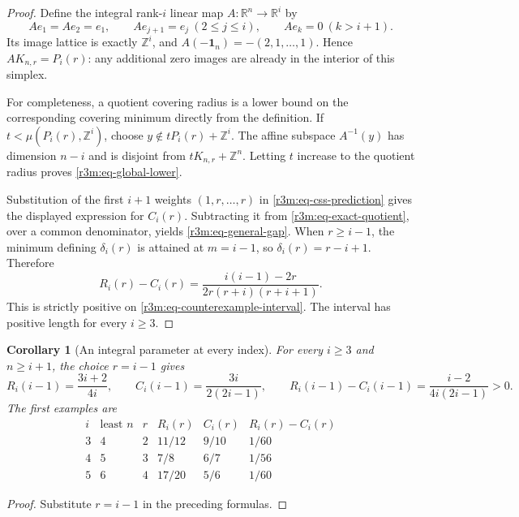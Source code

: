 \documentclass[11pt,a4paper]{article}
\newtheorem{corollary}[theorem]{Corollary}
\theoremstyle{remark}\newtheorem{remark}[theorem]{Remark}
\begin{document}
\begin{proof}
Define the integral rank-$i$ linear map $A:\mathbb R^n\to\mathbb R^i$ by
\[
 Ae_1=Ae_2=e_1,\qquad
 Ae_{j+1}=e_j\ (2\le j\le i),\qquad
 Ae_k=0\ (k>i+1).
\]
Its image lattice is exactly $\mathbb Z^i$, and
$A(-\mathbf1_n)=-(2,1,\ldots,1)$.  Hence
$AK_{n,r}=P_i(r)$: any additional zero images are already in the
interior of this simplex.

For completeness, a quotient covering radius is a lower bound on the
corresponding covering minimum directly from the definition.
If $t<\mu(P_i(r),\mathbb Z^i)$, choose
$y\notin tP_i(r)+\mathbb Z^i$.  The affine subspace $A^{-1}(y)$ has
dimension $n-i$ and is disjoint from $tK_{n,r}+\mathbb Z^n$.
Letting $t$ increase to the quotient radius proves
\eqref{r3m:eq-global-lower}.

Substitution of the first $i+1$ weights $(1,r,\ldots,r)$ in
\eqref{r3m:eq-css-prediction} gives the displayed expression for $C_i(r)$.
Subtracting it from \eqref{r3m:eq-exact-quotient}, over a common
denominator, yields \eqref{r3m:eq-general-gap}.
When $r\ge i-1$, the minimum defining $\delta_i(r)$ is attained at
$m=i-1$, so $\delta_i(r)=r-i+1$.  Therefore
\begin{equation}
\label{r3m:eq-large-r-gap}
 R_i(r)-C_i(r)
 =\frac{i(i-1)-2r}{2r(r+i)(r+i+1)}.
\end{equation}
This is strictly positive on \eqref{r3m:eq-counterexample-interval}.
The interval has positive length for every $i\ge3$.
\end{proof}

\begin{corollary}[An integral parameter at every index]
\label{r3m:cor-integral-examples}
For every $i\ge3$ and $n\ge i+1$, the choice $r=i-1$ gives
\[
 R_i(i-1)=\frac{3i+2}{4i},\qquad
 C_i(i-1)=\frac{3i}{2(2i-1)},\qquad
 R_i(i-1)-C_i(i-1)=\frac{i-2}{4i(2i-1)}>0.
\]
The first examples are
\[
\begin{array}{c|c|c|c|c|c}
 i&\text{least }n&r&R_i(r)&C_i(r)&R_i(r)-C_i(r)\\ \hline
 3&4&2&11/12&9/10&1/60\\
 4&5&3&7/8&6/7&1/56\\
 5&6&4&17/20&5/6&1/60
\end{array}
\]
\end{corollary}

\begin{proof}
Substitute $r=i-1$ in the preceding formulas.
\end{proof}
\end{document}
